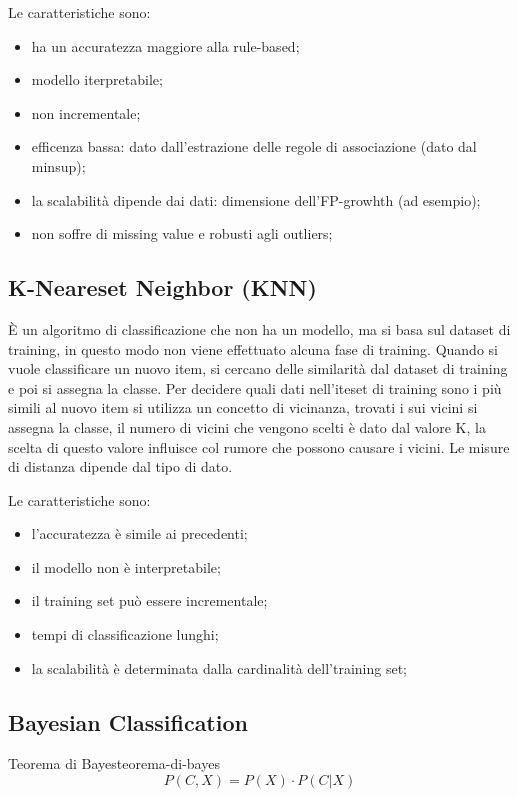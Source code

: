 \documentclass[12pt]{article}
\begin{document}
Le caratteristiche sono:
\begin{itemize}
    \item ha un accuratezza maggiore alla rule-based;
    \item modello iterpretabile;
    \item non incrementale;
    \item efficenza bassa: dato dall'estrazione delle regole di associazione (dato dal minsup);
    \item la scalabilit\`a dipende dai dati: dimensione dell'FP-growhth (ad esempio);
    \item non soffre di missing value e robusti agli outliers;
\end{itemize}


\subsection{K-Neareset Neighbor (KNN)}
\`E un algoritmo di classificazione che non ha un modello, ma si basa sul dataset di training, in questo modo non viene effettuato alcuna fase di training. Quando si vuole classificare un nuovo item, si cercano delle similarit\`a dal dataset di training e poi si assegna la classe. Per decidere quali dati nell'iteset di training sono i pi\`u simili al nuovo item si utilizza un concetto di vicinanza, trovati i sui vicini si assegna la classe, il numero di vicini che vengono scelti \`e dato dal valore K, la scelta di questo valore influisce col rumore che possono causare i vicini. Le misure di distanza dipende dal tipo di dato.

Le caratteristiche sono:
\begin{itemize}
    \item l'accuratezza \`e simile ai precedenti;
    \item il modello non \`e interpretabile;
    \item il training set pu\`o essere incrementale;
    \item tempi di classificazione lunghi;
    \item la scalabilit\`a \`e determinata dalla cardinalit\`a dell'training set;
\end{itemize}


\subsection{Bayesian Classification}
\begin{theorem}{Teorema di Bayes}{teorema-di-bayes}
    \[ P(C,X) = P(X) \cdot P(C|X) \]
\end{theorem}
\end{document}
